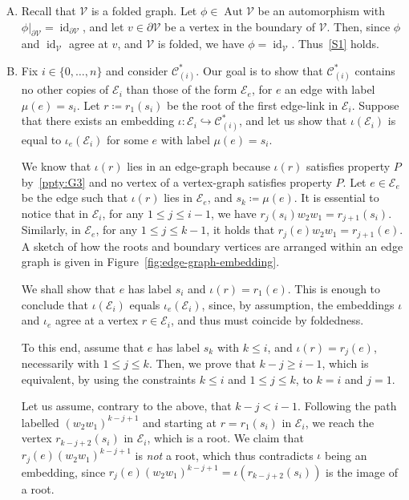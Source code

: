 \documentclass[10pt,a4paper]{amsart}
\theoremstyle{definition}
\newcommand{\cC}{\mathcal{C}}
\newcommand{\cV}{\mathcal{V}}
\newcommand{\cE}{\mathcal{E}}
\DeclareMathOperator{\aut}{Aut}
\DeclareMathOperator{\id}{id}
\begin{document}
\begin{enumerate}[S.\arabic*]
\item %
Recall that $\cV$ is a folded graph. Let ${\phi} \in \aut \cV$ be an automorphism with ${\phi}|_{{\partial}\cV} = \id _{{\partial}\cV}$, and let $v\in{\partial}\cV$ be a vertex in the boundary of $\cV$. Then, since ${\phi}$ and $\id _{\cV}$ agree at $v$, and $\cV$ is folded, we have ${\phi}= \id _{\cV}$. Thus~\ref{S1} holds.
\item %
Fix $i \in \{ 0, \dots, n\}$ and consider $\cC^*_{(i)}$. Our goal is to show that $\cC^*_{(i)}$ contains no other copies of $\cE_i$ than those of the form $\cE_e$, for $e$ an edge with label $\mu(e) = s_i$. Let $r\coloneqq r_1(s_i)$ be the root of the first edge-link in $\cE_i$. Suppose that there exists an embedding $\iota : \cE_i \hookrightarrow \cC^{*}_{(i)}$, and let us show that $\iota(\cE_i)$ is equal to ${\iota}_e(\cE_i)$ for some $e$ with label $\mu(e) = s_i$.

We know that $\iota(r)$ lies in an edge-graph because $\iota(r)$ satisfies property $P$ by~\ref{ppty:G3} and no vertex of a vertex-graph satisfies property $P$. Let $e\in \cE_e$ be the edge such that $\iota(r)$ lies in $\cE_{e}$, and $s_k \coloneqq {\mu}(e)$. It is essential to notice that in $\cE_i$, for any $1\leq j\leq i-1$, we have $r_j(s_i)w_{2}w_{1} = r_{j+1}(s_i)$. Similarly, in $\cE_e$, for any $1\leq j\leq k-1$, it holds that $r_j(e)w_{2}w_{1} = r_{j+1}(e)$. A sketch of how the roots and boundary vertices are arranged within an edge graph is given in Figure~\ref{fig:edge-graph-embedding}. 

We shall show that $e$ has label $s_i$ and ${\iota}(r) = r_1(e)$. This is enough to conclude that ${\iota}(\cE_i)$ equals ${\iota}_e(\cE_i)$, since, by assumption, the embeddings ${\iota}$ and ${\iota}_{e}$ agree at a vertex $r \in \cE_i$, and thus must coincide by foldedness.

To this end, assume that $e$ has label $s_k$ with $k\leq i$, and ${\iota}(r) = r_j(e)$, necessarily with $1\leq j\leq k$. Then, we prove that $k-j \geq i-1$, which is equivalent, by using the constraints $k\leq i$ and $1\leq j\leq k$, to $k=i$ and $j=1$. 

Let us assume, contrary to the above, that $k-j<i-1$. Following the path labelled $(w_{2}w_{1})^{k-j+1}$ and starting at $r = r_{1}(s_i)$ in $\cE_i$, we reach the vertex $r_{k-j+2}(s_i)$ in $\cE_i$, which is a root. We claim that $r_j(e)(w_{2}w_{1})^{k-j+1}$ is \emph{not} a root, which thus contradicts ${\iota}$ being an embedding, since $r_j(e)(w_{2}w_{1})^{k-j+1} = {\iota}(r_{k-j+2}(s_i))$ is the image of a root.
 

\end{enumerate}
\end{document}
